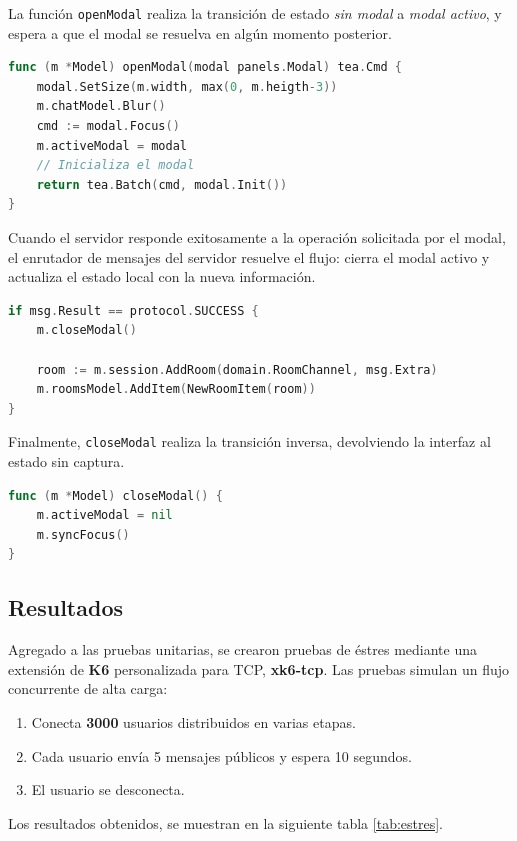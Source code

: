 La función \texttt{openModal} realiza la transición de estado \textit{sin modal} a \textit{modal
activo}, y espera a que el modal se resuelva en algún momento posterior.

\begin{lstlisting}[language=Go]
func (m *Model) openModal(modal panels.Modal) tea.Cmd {
    modal.SetSize(m.width, max(0, m.heigth-3))
    m.chatModel.Blur()
    cmd := modal.Focus()
    m.activeModal = modal
    // Inicializa el modal
    return tea.Batch(cmd, modal.Init())
}
\end{lstlisting}

Cuando el servidor responde exitosamente a la operación solicitada por el modal, el enrutador de mensajes 
del servidor resuelve el flujo: cierra el modal activo
y actualiza el estado local con la nueva información.

\begin{lstlisting}[language=Go]
if msg.Result == protocol.SUCCESS {
    m.closeModal()

    room := m.session.AddRoom(domain.RoomChannel, msg.Extra)
    m.roomsModel.AddItem(NewRoomItem(room))
}
\end{lstlisting}

Finalmente, \texttt{closeModal} realiza la transición inversa, devolviendo la interfaz al estado sin
captura.

\begin{lstlisting}[language=Go]
func (m *Model) closeModal() {
    m.activeModal = nil
    m.syncFocus()
}
\end{lstlisting}

\subsection*{Resultados}

Agregado a las pruebas unitarias, se crearon pruebas de éstres mediante una extensión de \textbf{K6} personalizada
para TCP, \textbf{xk6-tcp}. Las pruebas simulan un flujo concurrente de alta carga: 

\begin{enumerate}
    \item Conecta \textbf{3000} usuarios distribuidos en varias etapas.
    \item Cada usuario envía 5 mensajes públicos y espera 10 segundos.
    \item El usuario se desconecta.
\end{enumerate}

Los resultados obtenidos, se muestran en la siguiente tabla \ref{tab:estres}.


